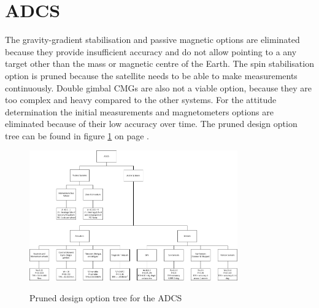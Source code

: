 \section{\acl{ADCS}}
\label{pruneADCS}
The gravity-gradient stabilisation and passive magnetic options are eliminated because they provide insufficient accuracy and do not allow pointing to a any target other than the mass or magnetic centre of the Earth. The spin stabilisation option is pruned because the satellite needs to be able to make measurements continuously. Double gimbal \acp{CMG} are also not a viable option, because they are too complex and heavy compared to the other systems.
For the attitude determination the initial measurements and magnetometers options are eliminated because of their low accuracy over time.
The pruned design option tree can be found in figure \ref{fig:pruneADCS} on page \pageref{fig:pruneADCS}.

\begin{figure}
\includegraphics[width=0.8\textwidth, angle=90]{chapters/img/prunedADCStree.png}
\label{fig:pruneADCS}
\caption{Pruned design option tree for the \ac{ADCS}}
\end{figure}